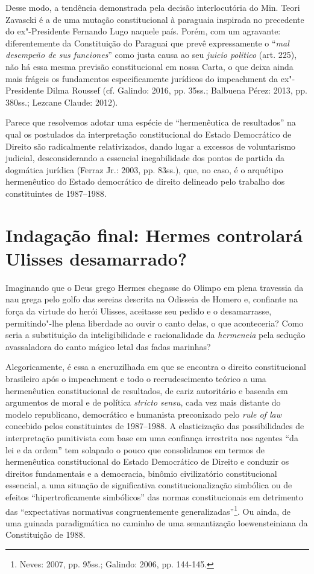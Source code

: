 Desse modo, a tendência demonstrada pela decisão interlocutória do Min.
Teori Zavascki é a de uma mutação constitucional à paraguaia inspirada
no precedente do ex"-Presidente Fernando Lugo naquele país. Porém, com um
agravante: diferentemente da Constituição do Paraguai que prevê
expressamente o ``\emph{mal desempeño de sus funciones}'' como justa
causa ao seu \emph{juicio politico} (art. 225), não há essa mesma
previsão constitucional em nossa Carta, o que deixa ainda mais frágeis
os fundamentos especificamente jurídicos do impeachment da
ex"-Presidente Dilma Roussef (cf. Galindo: 2016, pp. 35ss.; Balbuena
Pérez: 2013, pp. 380ss.; Lezcane Claude: 2012).

Parece que resolvemos adotar uma espécie de ``hermenêutica de
resultados'' na qual os postulados da interpretação constitucional do
Estado Democrático de Direito são radicalmente relativizados, dando
lugar a excessos de voluntarismo judicial, desconsiderando a essencial
inegabilidade dos pontos de partida da dogmática jurídica (Ferraz Jr.:
2003, pp. 83ss.), que, no caso, é o arquétipo hermenêutico do Estado
democrático de direito delineado pelo trabalho dos constituintes de
1987--1988.

\section{Indagação final: Hermes controlará Ulisses desamarrado?}

Imaginando que o Deus grego Hermes chegasse do Olimpo em plena travessia
da nau grega pelo golfo das sereias descrita na Odisseia de Homero e,
confiante na força da virtude do herói Ulisses, aceitasse seu pedido e o
desamarrasse, permitindo"-lhe plena liberdade ao ouvir o canto delas, o
que aconteceria? Como seria a substituição da inteligibilidade e
racionalidade da \emph{hermeneia} pela sedução avassaladora do canto
mágico letal das fadas marinhas?

Alegoricamente, é essa a encruzilhada em que se encontra o direito
constitucional brasileiro após o impeachment e todo o
recrudescimento teórico a uma hermenêutica constitucional de resultados,
de cariz autoritário e baseada em argumentos de moral e de política
\emph{stricto sensu}, cada vez mais distante do modelo republicano,
democrático e humanista preconizado pelo \emph{rule of law} concebido
pelos constituintes de 1987--1988. A elasticização das possibilidades de
interpretação punitivista com base em uma confiança irrestrita nos
agentes ``da lei e da ordem'' tem solapado o pouco que consolidamos em
termos de hermenêutica constitucional do Estado Democrático de Direito e
conduzir os direitos fundamentais e a democracia, binômio civilizatório
constitucional essencial, a uma situação de significativa
constitucionalização simbólica ou de efeitos ``hipertroficamente
simbólicos'' das normas constitucionais em detrimento das ``expectativas
normativas congruentemente generalizadas''\footnote{Neves: 2007, pp. 95ss.;
Galindo: 2006, pp. 144-145.}. Ou ainda, de uma guinada paradigmática no
caminho de uma semantização loewensteiniana da Constituição de 1988.

